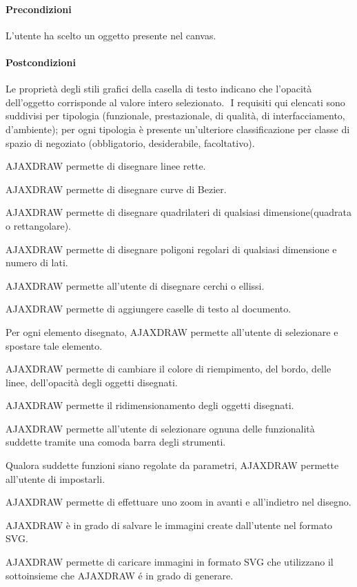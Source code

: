 \paragraph{Precondizioni} L'utente ha scelto un oggetto  presente nel canvas.
\paragraph{Postcondizioni} Le propriet\` a degli stili grafici della casella di testo indicano che l'opacit\` a dell'oggetto corrisponde al valore intero selezionato.
$  $
\label{listarequisiti}
I requisiti qui elencati sono suddivisi per tipologia (funzionale, prestazionale, di qualit\`a, di interfacciamento, d'ambiente); 
per ogni tipologia \`e presente un'ulteriore classificazione per classe di spazio di negoziato (obbligatorio, desiderabile, facoltativo). 
\begin{elenconumerato}{\subsubsecindent}
\item{AJAXDRAW permette di disegnare linee rette.}
\item{AJAXDRAW permette di disegnare curve di Bezier.}
\item{AJAXDRAW permette di disegnare quadrilateri di qualsiasi dimensione(quadrata o rettangolare).}
\item{AJAXDRAW permette di disegnare poligoni regolari di qualsiasi dimensione e numero di lati.}
\item{AJAXDRAW permette all'utente di disegnare cerchi o ellissi.}
\item{AJAXDRAW permette di aggiungere caselle di testo al documento. }
\item{Per ogni elemento disegnato, AJAXDRAW permette all'utente di selezionare e spostare tale elemento.}
\item{AJAXDRAW permette di cambiare il colore di riempimento, del bordo, delle linee, dell'opacità degli oggetti disegnati.}
\item{AJAXDRAW permette il ridimensionamento degli oggetti disegnati.}
\item{AJAXDRAW permette all'utente di selezionare ognuna delle funzionalit\`a suddette tramite una comoda barra degli strumenti.}
\item{Qualora suddette funzioni siano regolate da parametri, AJAXDRAW permette all'utente di impostarli.}
\item{AJAXDRAW permette di effettuare uno zoom in avanti e all'indietro nel disegno.}
\item{AJAXDRAW \`e in grado di salvare le immagini create dall'utente nel formato SVG.}
\item{AJAXDRAW permette di caricare immagini in formato SVG che utilizzano il sottoinsieme che AJAXDRAW \'e in grado di generare.}
\end{elenconumerato}

